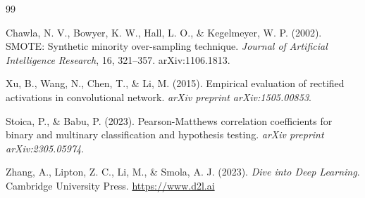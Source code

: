 \documentclass{acm_proc_article-sp}
\begin{document}
\begin{thebibliography}{99}

Chawla, N. V., Bowyer, K. W., Hall, L. O., \& Kegelmeyer, W. P. (2002). SMOTE: Synthetic minority over-sampling technique. \textit{Journal of Artificial Intelligence Research}, 16, 321--357. arXiv:1106.1813.

Xu, B., Wang, N., Chen, T., \& Li, M. (2015). Empirical evaluation of rectified activations in convolutional network. \textit{arXiv preprint arXiv:1505.00853}.

Stoica, P., \& Babu, P. (2023). Pearson-Matthews correlation coefficients for binary and multinary classification and hypothesis testing. \textit{arXiv preprint arXiv:2305.05974}.

Zhang, A., Lipton, Z. C., Li, M., \& Smola, A. J. (2023). \textit{Dive into Deep Learning}. Cambridge University Press. \url{https://www.d2l.ai}

\end{thebibliography}
\end{document}
